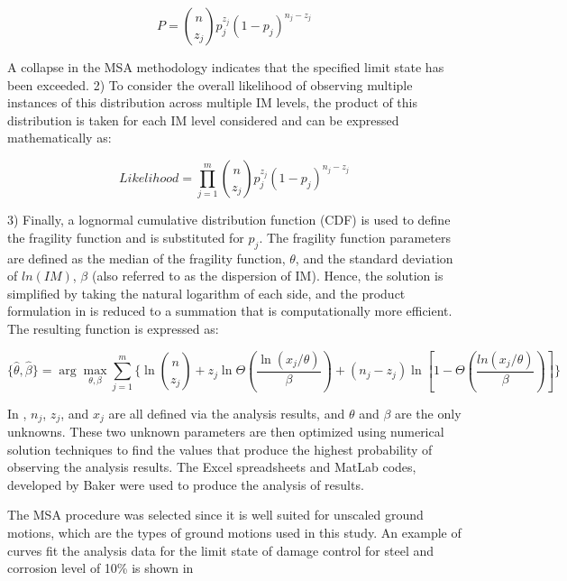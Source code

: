 \begin{equation}
   P=\binom{n}{z_{j}}p_{j}^{z_{j}}(1-p_{j})^{n_{j}-z_{j}} 
   \label{eq:P_MSA}
\end{equation}

A collapse in the MSA methodology indicates that the specified limit state has been exceeded. 2) To consider the overall likelihood of observing multiple instances of this distribution across multiple IM levels, the product of this distribution is taken for each IM level considered and can be expressed mathematically as:

\begin{equation}
   Likelihood=\prod_{j=1}^{m} \binom{n}{z_{j}}p_{j}^{z_{j}}(1-p_{j})^{n_{j}-z_{j}} 
   \label{eq:likelihood_MSA}
\end{equation}

3) Finally, a lognormal cumulative distribution function (CDF) is used to define the fragility function and is substituted for $p_j$. The fragility function parameters are defined as the median of the fragility function, $\theta$, and the standard deviation of $ln(IM)$, $\beta$ (also referred to as the dispersion of IM). Hence, the solution is simplified by taking the natural logarithm of each side, and the product formulation in is reduced to a summation that is computationally more efficient. The resulting function is expressed as:

\begin{equation}
  \{\hat{\theta},\hat{\beta}\}=\arg \max_{\theta,\beta} \sum_{j=1}^{m} \bigg\{\ln\binom{n}{z_{j}} +z_{j}\ln\Theta\left(\frac{\ln(x_{j}/\theta)}{\beta}\right) + (n_{j}-z_{j})\ln\left[1-\Theta\left(\frac{ln(x_{j}/\theta)}{\beta}\right)\right]\bigg\} 
  \label{eq:hat_theta_beta_MSA}
\end{equation}

In , $n_j$, $z_j$, and $x_j$ are all defined via the analysis results, and $\theta$ and $\beta$ are the only unknowns. These two unknown parameters are then optimized using numerical solution techniques to find the values that produce the highest probability of observing the analysis results. The Excel spreadsheets and MatLab codes, developed by Baker \cite{Baker2015} were used to produce the analysis of results.

The MSA procedure was selected since it is well suited for unscaled ground motions, which are the types of ground motions used in this study. An example of curves fit the analysis data for the limit state of damage control for steel and corrosion level of 10\% is shown in 

